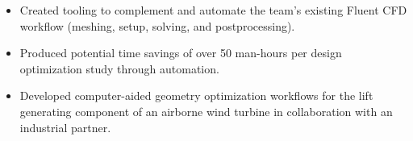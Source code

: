 \documentclass[10.5pt,a4paper,ragged2e]{altacv}
\begin{document}
\divider

\begin{itemize}
\item Created tooling to complement and automate the team's existing Fluent CFD workflow (meshing, setup, solving, and postprocessing).
\item Produced potential time savings of over 50 man-hours per design optimization study through automation.
\end{itemize}

\divider

\begin{itemize}
\item Developed computer-aided geometry optimization workflows for the lift generating component of an airborne wind turbine in collaboration with an industrial partner.
\end{itemize}





\medskip
\end{document}
